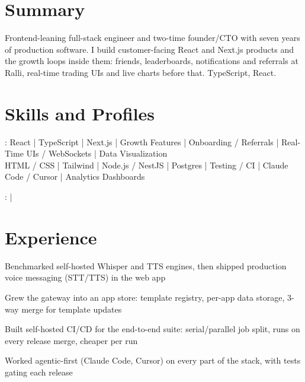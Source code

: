 \documentclass[print]{jack-resume}
\begin{document}
\pagecolor{darkmodeBackground}


\begin{minipage}[t][1cm][t]{.03\textwidth}
    \hfill
\end{minipage}

\section{Summary}
Frontend-leaning full-stack engineer and two-time founder/CTO with seven years of production software. I build customer-facing React and Next.js products and the growth loops inside them: friends, leaderboards, notifications and referrals at Ralli, real-time trading UIs and live charts before that. TypeScript, React.
\sectionsep

\section{Skills and Profiles}
:
React \hfill | \hfill
TypeScript \hfill | \hfill
Next.js \hfill | \hfill
Growth Features \hfill | \hfill
Onboarding / Referrals \hfill | \hfill
Real-Time UIs / WebSockets \hfill | \hfill
Data Visualization \\
\hspace{1.0cm} HTML / CSS \hfill | \hfill
Tailwind \hfill | \hfill
Node.js / NestJS \hfill | \hfill
Postgres \hfill | \hfill
Testing / CI \hfill | \hfill
Claude Code / Cursor \hfill | \hfill
Analytics Dashboards \\

\raggedright{
    :
      \href{https://www.linkedin.com/in/jack-sturtevant/}{ \ExternalLink} |
     \href{https://github.com/jacksturt}{ \ExternalLink}}

\section{Experience}

\begin{tightemize}
    \item Benchmarked self-hosted Whisper and TTS engines, then shipped production voice messaging (STT/TTS) in the web app
    \item Grew the gateway into an app store: template registry, per-app data storage, 3-way merge for template updates
    \item Built self-hosted CI/CD for the end-to-end suite: serial/parallel job split, runs on every release merge, cheaper per run
    \item Worked agentic-first (Claude Code, Cursor) on every part of the stack, with tests gating each release
\end{tightemize}
\sectionsep
\end{document}
